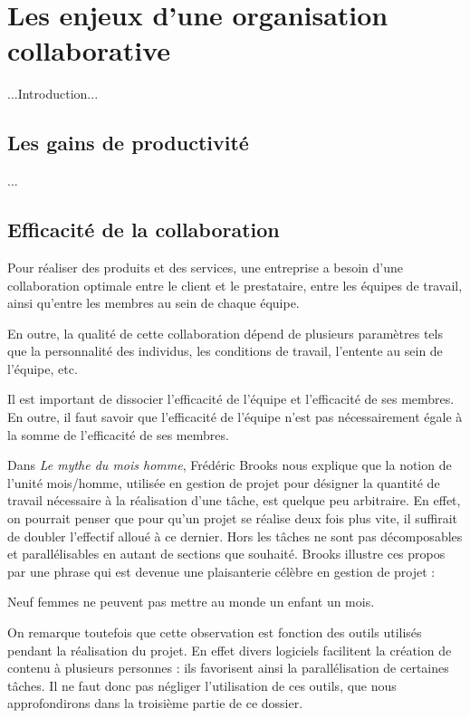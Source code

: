 \chapter{Les enjeux d'une organisation collaborative}

...Introduction...

\section{Les gains de productivité}

...

\section{Efficacité de la collaboration}

Pour réaliser des produits et des services, une entreprise a besoin d'une collaboration optimale entre le client et le prestataire, entre les équipes de travail, ainsi qu'entre les membres au sein de chaque équipe.

En outre, la qualité de cette collaboration dépend de plusieurs paramètres tels que la personnalité des individus, les conditions de travail, l'entente au sein de l'équipe, etc.

Il est important de dissocier l'efficacité de l'équipe et l'efficacité de ses membres. En outre, il faut savoir que l'efficacité de l'équipe n'est pas nécessairement égale à la somme de l'efficacité de ses membres.

Dans \textit{Le mythe du mois homme}, Frédéric Brooks nous explique que la notion de l'unité mois/homme, utilisée en gestion de projet pour désigner la quantité de travail nécessaire à la réalisation d'une tâche, est quelque peu arbitraire. En effet, on pourrait penser que pour qu'un projet se réalise deux fois plus vite, il suffirait de doubler l'effectif alloué à ce dernier. Hors les tâches ne sont pas décomposables et parallélisables en autant de sections que souhaité. Brooks illustre ces propos par une phrase qui est devenue une plaisanterie célèbre en gestion de projet : \begin{Quote}Neuf femmes ne peuvent pas mettre au monde un enfant un mois.\end{Quote}

On remarque toutefois que cette observation est fonction des outils utilisés pendant la réalisation du projet. En effet divers logiciels facilitent la création de contenu à plusieurs personnes : ils favorisent ainsi la parallélisation de certaines tâches. Il ne faut donc pas négliger l'utilisation de ces outils, que nous approfondirons dans la troisième partie de ce dossier.

